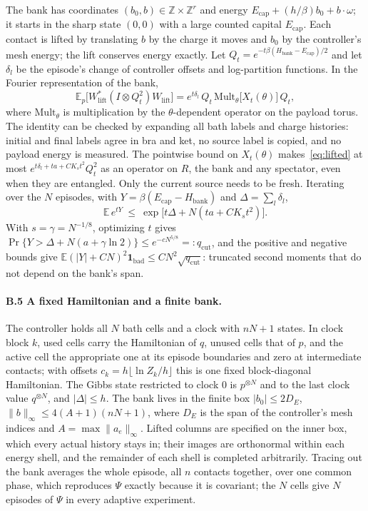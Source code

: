 \documentclass[11pt]{article}
\theoremstyle{definition}
\theoremstyle{remark}
\begin{document}
The bank has coordinates $(b_0,b)\in\mathbb Z\times\mathbb Z^r$ and energy $E_{\mathrm{cap}}+(h/\beta)b_0+b\cdot\omega$; it starts in the sharp state $(0,0)$ with a large counted capital $E_{\mathrm{cap}}$. Each contact is lifted by translating $b$ by the charge it moves and $b_0$ by the controller's mesh energy; the lift conserves energy exactly. Let $Q_t=e^{-t\beta(H_{\mathrm{bank}}-E_{\mathrm{cap}})/2}$ and let $\delta_l$ be the episode's change of controller offsets and log-partition functions. In the Fourier representation of the bank,
\begin{equation}\label{eq:lifted}
\mathbb E_p\bigl[W_{\mathrm{lift}}^*(I\otimes Q_t^2)W_{\mathrm{lift}}\bigr]=e^{t\delta_l}\,Q_t\,\mathrm{Mult}_\theta\bigl[X_t(\theta)\bigr]\,Q_t,
\end{equation}
where $\mathrm{Mult}_\theta$ is multiplication by the $\theta$-dependent operator on the payload torus. The identity can be checked by expanding all bath labels and charge histories: initial and final labels agree in bra and ket, no source label is copied, and no payload energy is measured. The pointwise bound on $X_t(\theta)$ makes~\eqref{eq:lifted} at most $e^{t\delta_l+ta+CK_st^2}Q_t^2$ as an operator on $R$, the bank and any spectator, even when they are entangled. Only the current source needs to be fresh. Iterating over the $N$ episodes, with $Y=\beta(E_{\mathrm{cap}}-H_{\mathrm{bank}})$ and $\Delta=\sum_l\delta_l$,
\[
\mathbb E\,e^{tY}\ \le\ \exp\bigl[t\Delta+N(ta+CK_st^2)\bigr].
\]
With $s=\gamma=N^{-1/8}$, optimizing $t$ gives $\Pr\{Y>\Delta+N(a+\gamma\ln2)\}\le e^{-cN^{5/8}}=:q_{\mathrm{cut}}$, and the positive and negative bounds give $\mathbb E(|Y|+CN)^2\mathbf 1_{\mathrm{bad}}\le CN^2\sqrt{q_{\mathrm{cut}}}$: truncated second moments that do not depend on the bank's span.

\paragraph{B.5 A fixed Hamiltonian and a finite bank.} The controller holds all $N$ bath cells and a clock with $nN+1$ states. In clock block $k$, used cells carry the Hamiltonian of $q$, unused cells that of $p$, and the active cell the appropriate one at its episode boundaries and zero at intermediate contacts; with offsets $c_k=h\lfloor\ln Z_k/h\rfloor$ this is one fixed block-diagonal Hamiltonian. The Gibbs state restricted to clock $0$ is $p^{\otimes N}$ and to the last clock value $q^{\otimes N}$, and $|\Delta|\le h$. The bank lives in the finite box $|b_0|\le2D_E$, $\|b\|_\infty\le4(A+1)(nN+1)$, where $D_E$ is the span of the controller's mesh indices and $A=\max\|a_e\|_\infty$. Lifted columns are specified on the inner box, which every actual history stays in; their images are orthonormal within each energy shell, and the remainder of each shell is completed arbitrarily. Tracing out the bank averages the whole episode, all $n$ contacts together, over one common phase, which reproduces $\Psi$ exactly because it is covariant; the $N$ cells give $N$ episodes of $\Psi$ in every adaptive experiment.
\end{document}

